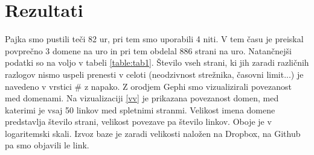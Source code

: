 \documentclass[a4paper,10pt]{paper}
\begin{document}
\section{Rezultati}
Pajka smo pustili teči 82 ur, pri tem smo uporabili 4 niti. V tem času je preiskal povprečno 3 domene na uro in pri tem obdelal 886 strani na uro. Natančnejši podatki so na voljo v tabeli \ref{table:tab1}. Število vseh strani, ki jih zaradi različnih razlogov nismo uspeli prenesti v celoti (neodzivnost strežnika, časovni limit...) je navedeno v vrstici \# z napako.
Z orodjem Gephi smo vizualizirali povezanost med domenami. Na vizualizaciji \ref{vv} je prikazana povezanost domen, med katerimi je vsaj 50 linkov med spletnimi stranmi. Velikost imena domene predstavlja število strani, velikost povezave pa število linkov. Oboje je v logaritemski skali. Izvoz baze je zaradi velikosti naložen na Dropbox, na Github pa smo objavili le link.
\end{document}
